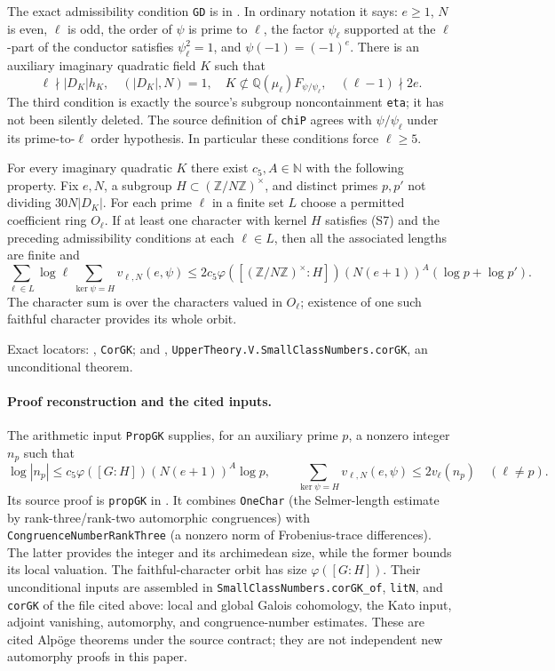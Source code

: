 The exact admissibility condition \texttt{GD} is in
. In ordinary notation it says:
$e\ge1$, $N$ is even, $\ell$ is odd, the order of $\psi$ is prime to
$\ell$, the factor $\psi_\ell$ supported at the $\ell$-part of the
conductor satisfies $\psi_\ell^2=1$, and
$\psi(-1)=(-1)^e$. There is an auxiliary imaginary quadratic field $K$
such that
\[
 \ell\nmid |D_K|h_K,\quad (|D_K|,N)=1,\quad
 K\not\subset\mathbb Q(\mu_\ell)F_{\psi/\psi_\ell},\quad
 (\ell-1)\nmid2e. \tag{S7}
\]
The third condition is exactly the source's subgroup noncontainment
\texttt{eta}; it has not been silently deleted. The source definition
of \texttt{chiP} agrees with $\psi/\psi_\ell$ under its prime-to-$\ell$
order hypothesis. In particular these conditions force $\ell\ge5$.

\begin{sourcefact}
For every imaginary quadratic $K$ there exist $c_5,A\in\mathbb N$ with
the following property. Fix $e,N$, a subgroup
$H\subset(\mathbb Z/N\mathbb Z)^\times$, and distinct primes $p,p'$
not dividing $30N|D_K|$. For each prime $\ell$ in a finite set $L$ choose
a permitted coefficient ring $O_\ell$. If at least one character with
kernel $H$ satisfies (S7) and the preceding admissibility conditions at
each $\ell\in L$, then all the associated lengths are finite and
\[
 \sum_{\ell\in L}\log\ell
   \sum_{\ker\psi=H}v_{\ell,N}(e,\psi)
 \le 2c_5\varphi([(\mathbb Z/N\mathbb Z)^\times:H])
          (N(e+1))^A(\log p+\log p'). \tag{S8}
\]
The character sum is over the characters valued in $O_\ell$; existence
of one such faithful character provides its whole orbit.

Exact locators: ,
\texttt{CorGK}; and ,
\texttt{UpperTheory.V.SmallClassNumbers.corGK}, an unconditional theorem.
\end{sourcefact}

\paragraph{Proof reconstruction and the cited inputs.}
The arithmetic input \texttt{PropGK} supplies, for an auxiliary prime $p$,
a nonzero integer $n_p$ such that
\[
 \log|n_p|\le c_5\varphi([G:H])(N(e+1))^A\log p,
 \qquad
 \sum_{\ker\psi=H}v_{\ell,N}(e,\psi)\le2v_\ell(n_p)
 \quad(\ell\ne p). \tag{S9}
\]
Its source proof is \texttt{propGK} in
. It combines
\texttt{OneChar} (the Selmer-length estimate by rank-three/rank-two
automorphic congruences) with \texttt{CongruenceNumberRankThree}
(a nonzero norm of Frobenius-trace differences). The latter provides the
integer and its archimedean size, while the former bounds its local
valuation. The faithful-character orbit has size $\varphi([G:H])$.
Their unconditional inputs are assembled in
\texttt{SmallClassNumbers.corGK\_of}, \texttt{litN}, and \texttt{corGK}
of the file cited above: local and global Galois cohomology, the Kato
input, adjoint vanishing, automorphy, and congruence-number estimates.
These are cited Alp\"oge theorems under the source contract; they are
not independent new automorphy proofs in this paper.

